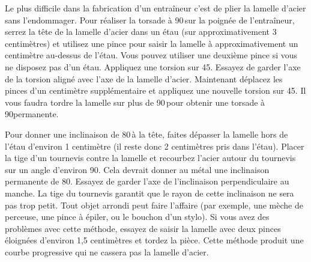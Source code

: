 \documentclass[a4paper,french,11pt,twoside]{report}
\begin{document}
Le plus difficile dans la fabrication d'un entraîneur c'est de plier la lamelle d'acier sans l'endommager. Pour réaliser la torsade à 90\degres\,sur la poignée de l'entraîneur, serrez la tête de la lamelle d'acier dans un étau (sur approximativement 3 centimètres) et utilisez une pince pour saisir la lamelle à approximativement un centimètre au-dessus de l'étau. Vous pouvez utiliser une deuxième pince si vous ne disposez pas d'un étau. Appliquez une torsion sur 45\degres. Essayez de garder l'axe de la torsion aligné avec l'axe de la lamelle d'acier. Maintenant déplacez les pinces d'un centimètre supplémentaire et appliquez une nouvelle torsion sur 45\degres. Il vous faudra tordre la lamelle sur plus de 90\degres\,pour obtenir une torsade à 90\degres permanente.

Pour donner une inclinaison de 80\degres\,à la tête, faites dépasser la lamelle hors de l'étau d'environ 1 centimètre (il reste donc 2 centimètres pris dans l'étau). Placer la tige d'un tournevis contre la lamelle et recourbez l'acier autour du tournevis sur un angle d'environ 90\degres. Cela devrait donner au métal une inclinaison permanente de 80\degres. Essayez de garder l'axe de l'inclinaison perpendiculaire au manche. La tige du tournevis garantit que le rayon de cette inclinaison ne sera pas trop petit. Tout objet arrondi peut faire l'affaire (par exemple, une mèche de perceuse, une pince à épiler, ou le bouchon d'un stylo). Si vous avez des problèmes avec cette méthode, essayez de saisir la lamelle avec deux pinces éloignées d'environ 1,5 centimètres et tordez la pièce. Cette méthode produit une courbe progressive qui ne cassera pas la lamelle d'acier.
\end{document}
